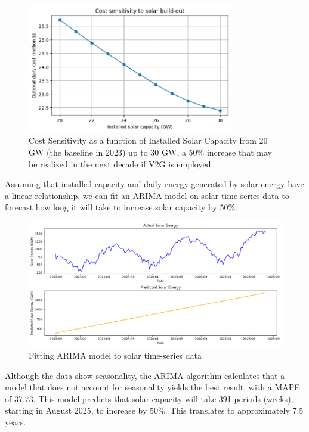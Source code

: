 \documentclass[12pt, letterpaper]{article}
\begin{document}
\begin{figure}[H]
    \centering
    \includegraphics[width=0.8\textwidth]{solar_cost_sensitivity.png}
    \caption{Cost Sensitivity as a function of Installed Solar Capacity from 20 GW (the baseline in 2023) up to 30 GW, a 50\% increase that may be realized in the next decade if V2G is employed.}
    \label{fig:solar_sensitivity}
\end{figure}

Assuming that installed capacity and daily energy generated by solar energy have a linear relationship, we can fit an ARIMA model on solar time series data to forecast how long it will take to increase solar capacity by 50\%. 

\begin{figure}[H]
    \centering
    \includegraphics[width=\textwidth]{solar_arima.png}
    \caption{Fitting ARIMA model to solar time-series data}
    \label{fig:solar_arima}
\end{figure}

Although the data show seasonality, the ARIMA algorithm calculates that a model that does not account for seasonality yields the best result, with a MAPE of 37.73. This model predicts that solar capacity will take 391 periods (weeks), starting in August 2025, to increase by 50\%. This translates to approximately 7.5 years. 
\end{document}
